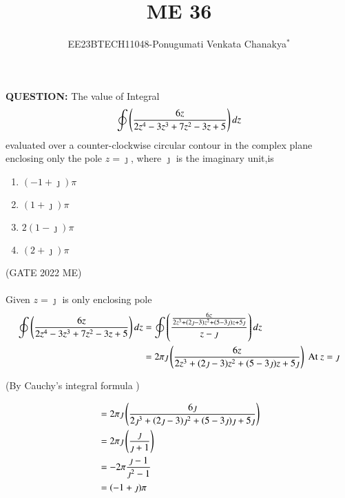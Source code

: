 \documentclass[journal,12pt,onecolumn]{IEEEtran}
\theoremstyle{remark}
\begin{document}
 
 \vspace{3cm}
 \title{\textbf{ME 36}}
 \author{EE23BTECH11048-Ponugumati Venkata Chanakya$^{*}$%
 }
 \maketitle

 \bigskip
 \renewcommand{\thefigure}{\theenumi}
 \renewcommand{\thetable}{\theenumi}
 \textbf{QUESTION:}
 The value of Integral \\
  \begin{align*}
        \oint \left(\frac{6z}{2z^4-3z^3+7z^2-3z+5}\right)dz
 \end{align*}
 evaluated over a counter-clockwise circular contour in the complex plane enclosing only the pole $z=\jmath $, where $\jmath$ is the imaginary unit,is
 \begin{enumerate}
     \item $(-1+\jmath)\pi$
     \item $(1+\jmath)\pi$
     \item $2(1-\jmath)\pi$
     \item $(2+\jmath)\pi$
 \end{enumerate}
 \hfill{(GATE 2022 ME)}\\
 \solution\\

 Given $z=\jmath$ is only enclosing pole 
 \begin{align}
 \oint \left(\frac{6z}{2z^4-3z^3+7z^2-3z+5}\right)dz
 &=\oint \left(\frac{\frac{6z}{2z^3+(2\jmath-3)z^2+(5-3\jmath)z+5\jmath}}{z-\jmath}\right)dz\\
 &=2\pi \jmath\left(\frac{6z}{2z^3+(2\jmath-3)z^2+(5-3\jmath)z+5\jmath}\right) \text{ At }z=\jmath
 \end{align}
\begin{center}
    (By Cauchy's integral formula )
\end{center}
    \begin{align}
    &=2\pi \jmath\left(\frac{6\jmath}{2\jmath^3+(2\jmath-3)\jmath^2+(5-3\jmath)\jmath+5\jmath}\right)\\
    &=2\pi \jmath\left(\frac{\jmath}{\jmath+1}\right)\\
    &=-2\pi \frac{\jmath-1}{\jmath^2-1}\\
    &=(-1+\jmath)\pi
    \end{align}
 
\end{document}
